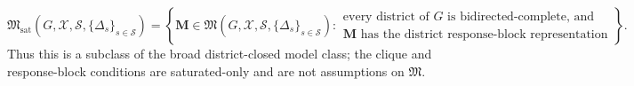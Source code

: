 \[
\mathfrak M_{\mathrm{sat}}(G,\mathcal X,\mathcal S,\{\Delta_s\}_{s\in\mathcal S})
=\left\{\mathbf M\in\mathfrak M(G,\mathcal X,\mathcal S,\{\Delta_s\}_{s\in\mathcal S}):
\begin{array}{l}
\text{every district of \(G\) is bidirected-complete, and}\\
\text{\(\mathbf M\) has the district response-block representation}
\end{array}
\right\}.
\]
Thus this is a subclass of the broad district-closed model class; the clique and response-block conditions are saturated-only and are not assumptions on \(\mathfrak M\).